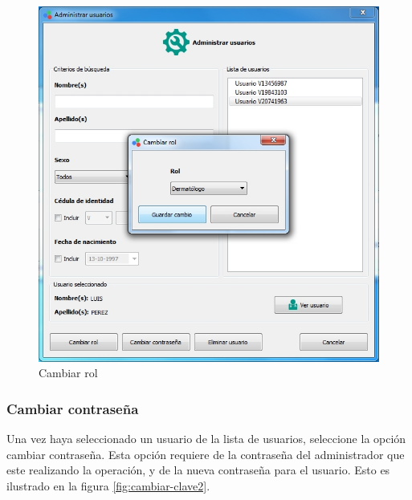 \begin{figure}[H]
  \centering
  \includegraphics[width=1\linewidth]{./img/administrar-rol.jpg}
\caption[]{Cambiar rol\label{fig:cambiar-rol}}
\end{figure}
\newpage
		\subsubsection*{Cambiar contrase\~{n}a}
		
		Una vez haya seleccionado un usuario de la lista de usuarios, seleccione la opci\'{o}n cambiar contrase\~{n}a. Esta opci\'{o}n requiere de la contrase\~{n}a del administrador que este realizando la operaci\'{o}n, y de la nueva contrase\~{n}a para el usuario. Esto es ilustrado en la figura \ref{fig:cambiar-clave2}.
		
